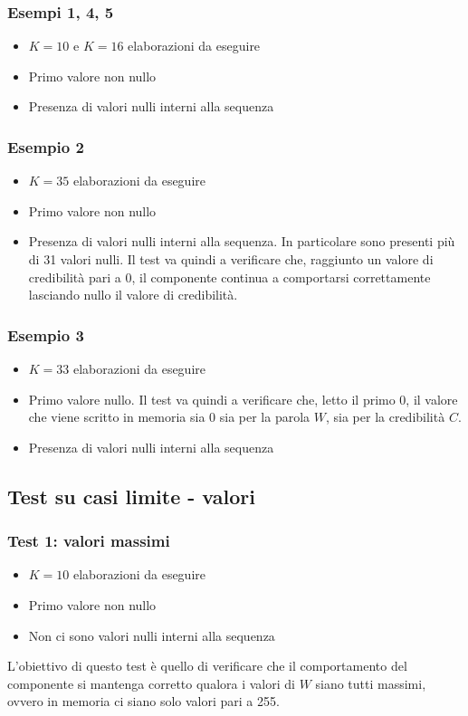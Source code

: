 \documentclass[10pt]{article}
\begin{document}
	\subsubsection{Esempi 1, 4, 5}
	\begin{itemize}
		\item $K=10$ e $K=16$ elaborazioni da eseguire
		\item Primo valore non nullo
		\item Presenza di valori nulli interni alla sequenza
	\end{itemize}
	\subsubsection{Esempio 2}
	\begin{itemize}
		\item $K=35$ elaborazioni da eseguire
		\item Primo valore non nullo
		\item Presenza di valori nulli interni alla sequenza. In particolare sono presenti più di 31 valori nulli. Il test va quindi a verificare che, raggiunto un valore di credibilità pari a 0, il componente continua a comportarsi correttamente lasciando nullo il valore di credibilità.
	\end{itemize}
	\subsubsection{Esempio 3}
	\begin{itemize}
		\item $K=33$ elaborazioni da eseguire
		\item Primo valore nullo. Il test va quindi a verificare che, letto il primo 0, il valore che viene scritto in memoria sia 0 sia per la parola $W$, sia per la credibilità $C$.
		\item Presenza di valori nulli interni alla sequenza
	\end{itemize}
	\subsection{Test su casi limite - valori}
	\subsubsection{Test 1: valori massimi}
	\begin{itemize}
		\item $K=10$ elaborazioni da eseguire
		\item Primo valore non nullo
		\item Non ci sono valori nulli interni alla sequenza
	\end{itemize}
	L'obiettivo di questo test è quello di verificare che il comportamento del componente si mantenga corretto qualora i valori di $W$ siano tutti massimi, ovvero in memoria ci siano solo valori pari a 255.
\end{document}
